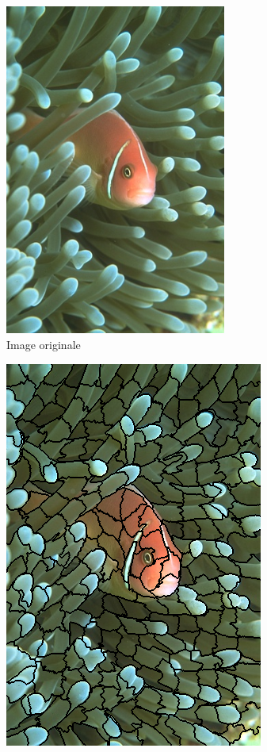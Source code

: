 \documentclass[12pt]{article}
\begin{document}
\begin{figure}
  \begin{subfigure}{0.48\textwidth}
    \centering
    \includegraphics[width=0.8\textwidth]{fish/fish.png}
    \caption{Image originale}
  \end{subfigure}
  \begin{subfigure}{0.48\textwidth}
    \centering
    \includegraphics[width=.8\textwidth]{fish/fish_segmented_256.png}

\end{subfigure}
\end{figure}
\end{document}
